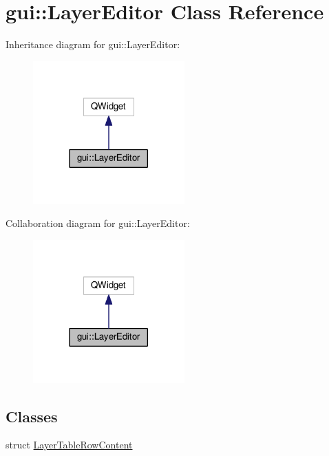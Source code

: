 \hypertarget{classgui_1_1LayerEditor}{}\section{gui\+:\+:Layer\+Editor Class Reference}
\label{classgui_1_1LayerEditor}


Inheritance diagram for gui\+:\+:Layer\+Editor\+:\nopagebreak
\begin{figure}[H]
\begin{center}
\leavevmode
\includegraphics[width=165pt]{classgui_1_1LayerEditor__inherit__graph}
\end{center}
\end{figure}


Collaboration diagram for gui\+:\+:Layer\+Editor\+:\nopagebreak
\begin{figure}[H]
\begin{center}
\leavevmode
\includegraphics[width=165pt]{classgui_1_1LayerEditor__coll__graph}
\end{center}
\end{figure}
\subsection*{Classes}
\begin{DoxyCompactItemize}
\item 
struct \hyperlink{structgui_1_1LayerEditor_1_1LayerTableRowContent}{Layer\+Table\+Row\+Content}
\end{DoxyCompactItemize}
